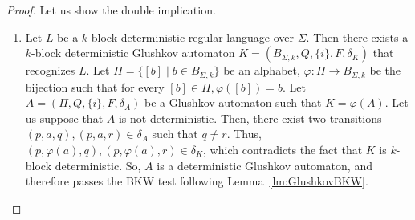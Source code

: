 \documentclass{llncs}
\begin{document}
\begin{proof}
  Let us show the double implication.
  \begin{enumerate}
	\item Let $L$ be a $k$-block deterministic regular language over $\Sigma$.
	Then there exists a $k$-block deterministic Glushkov automaton $K = (B_{\Sigma, k}, Q, \{i\}, F, \delta_K)$ that recognizes $L$.
	Let $\Pi = \{[b] \mid b \in B_{\Sigma, k}\}$ be an alphabet, $\varphi : \Pi \rightarrow B_{\Sigma, k}$ be
	the bijection such that for every $[b] \in \Pi, \varphi([b]) = b$. Let $A = (\Pi, Q, \{i\}, F, \delta_A)$ be a Glushkov automaton such that $K = \varphi(A)$.
	Let us suppose that $A$ is not deterministic.
	Then, there exist two transitions $(p, a, q), (p, a, r) \in \delta_A$ such that $q \neq r$.
	Thus, $(p, \varphi(a), q), (p, \varphi(a), r) \in \delta_K$, which contradicts the fact that $K$ is $k$-block deterministic.
	So, $A$ is a deterministic Glushkov automaton, and therefore passes the BKW test following Lemma~\ref{lm:GlushkovBKW}.
	

\end{enumerate}
\end{proof}
\end{document}
